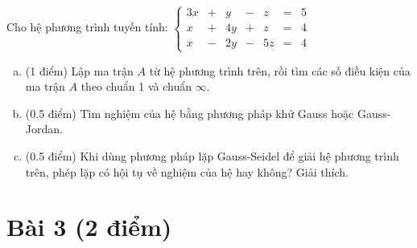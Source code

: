 \documentclass[11pt]{article}
\newcommand{\Solution}{
\medskip
{\bf \underline{Đáp án}:}
}
\begin{document}
Cho hệ phương trình tuyến tính:
$
\left\lbrace \begin{array}{rrrrrrr}
    3x &+& y &-& z &=& 5\\
    x &+& 4y &+& z &=& 4\\
    x &-& 2y &-& 5z &=& 4
             \end{array}
  \right.
$  
\begin{enumerate}[a).]
 \item (1 điểm) Lập ma trận $A$ từ hệ phương trình trên, rồi tìm các số điều kiện của ma trận $A$ theo chuẩn 1 và chuẩn $\infty$.
 \item (0.5 điểm) Tìm nghiệm của hệ bằng phương pháp khử Gauss hoặc Gauss-Jordan.
 \item (0.5 điểm) Khi dùng phương pháp lặp Gauss-Seidel để giải hệ phương trình trên, phép lặp có hội tụ về nghiệm của hệ hay không? Giải thích.
\end{enumerate}

% 


\section{Bài 3 (2 điểm)}
\end{document}
